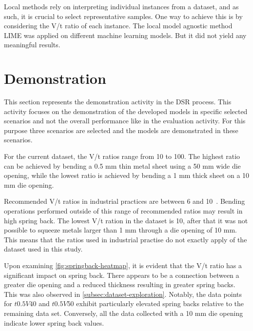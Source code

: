 Local methods rely on interpreting individual instances from a dataset, and as such, it is
crucial to select representative samples.
One way to achieve this is by considering the V/t ratio of each instance.
The local model agnostic method LIME was applied on different machine learning models.
But it did not yield any meaningful results.


\section{Demonstration}\label{sec:demonstration}
This section represents the demonstration activity in the \ac{DSR} process.
This activity focuses on the demonstration of the developed models in specific selected scenarios and not the
overall performance like in the evaluation activity.
For this purpose three scenarios are selected and the models are demonstrated in these scenarios.

For the current dataset, the V/t ratios range from 10 to 100.
The highest ratio can be achieved by bending a 0.5 mm thin metal sheet using a 50 mm wide die opening, while the
lowest ratio is achieved by bending a 1 mm thick sheet on a 10 mm die opening.

Recommended V/t ratios in industrial practices are between 6 and 10~\cite[p.7]{cruz_applicationmachinelearning_2021}.
Bending operations performed outside of this range of recommended ratios may result in
high spring back.
The lowest V/t ration in the dataset is 10, after that it was not possible to squeeze metals larger than 1 mm
through a die opening of 10 mm.
This means that the ratios used in industrial practise do not exactly apply of the dataset used in this study.

Upon examining \cref{fig:springback-heatmap}, it is evident that the V/t ratio has a significant impact on
spring back.
There appears to be a connection between a greater die opening and a reduced thickness resulting in greater spring
backs. This was also observed in \cref{subsec:dataset-exploration}.
Notably, the data points for $t0.5 V40$ and $t0.5 V50$ exhibit particularly elevated spring backs relative to the
remaining data set.
Conversely, all the data collected with a 10 mm die opening indicate lower spring back values.

